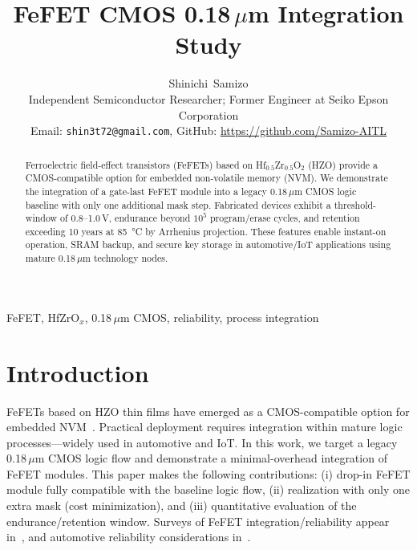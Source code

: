 \documentclass[journal]{IEEEtran}
\begin{document}
\title{FeFET CMOS 0.18\,$\mu$m Integration Study}
\author{Shinichi~Samizo\\
\small Independent Semiconductor Researcher; Former Engineer at Seiko Epson Corporation\\
\small Email: \texttt{shin3t72@gmail.com}, GitHub: \url{https://github.com/Samizo-AITL}}
\maketitle

\begin{abstract}
Ferroelectric field-effect transistors (FeFETs) based on Hf$_{0.5}$Zr$_{0.5}$O$_2$ (HZO) provide a CMOS-compatible option for embedded non-volatile memory (NVM). We demonstrate the integration of a gate-last FeFET module into a legacy 0.18\,$\mu$m CMOS logic baseline with only one additional mask step. Fabricated devices exhibit a threshold-window of 0.8–1.0\,V, endurance beyond $10^5$ program/erase cycles, and retention exceeding 10 years at \SI{85}{\celsius} by Arrhenius projection. These features enable instant-on operation, SRAM backup, and secure key storage in automotive/IoT applications using mature 0.18\,$\mu$m technology nodes.
\end{abstract}

\begin{IEEEkeywords}
FeFET, HfZrO$_x$, 0.18\,$\mu$m CMOS, reliability, process integration
\end{IEEEkeywords}

\section{Introduction}
FeFETs based on HZO thin films have emerged as a CMOS-compatible option for embedded NVM~\cite{Boscke2011,Muller2012,Schenk2019}. Practical deployment requires integration within mature logic processes—widely used in automotive and IoT. In this work, we target a legacy 0.18\,$\mu$m CMOS logic flow and demonstrate a minimal-overhead integration of FeFET modules. This paper makes the following contributions: (i) drop-in FeFET module fully compatible with the baseline logic flow, (ii) realization with only one extra mask (cost minimization), and (iii) quantitative evaluation of the endurance/retention window. Surveys of FeFET integration/reliability appear in~\cite{Mueller2015,Park2020}, and automotive reliability considerations in~\cite{Nakamura2003}.

\end{document}
